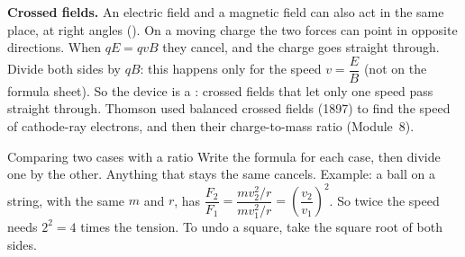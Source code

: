\textbf{Crossed fields.} An electric field and a magnetic field can also act in
the same place, at right angles (). On a moving charge the
two forces can point in opposite directions. When $qE = qvB$ they cancel, and
the charge goes straight through. Divide both sides by $qB$: this happens only
for the speed $v = \dfrac{E}{B}$ (not on the formula sheet). So the device is a
: crossed fields that let only one speed pass straight
through. Thomson used balanced crossed fields (1897) to find the speed of
cathode-ray electrons, and then their charge-to-mass ratio (Module~8).

\begin{toolkit}{Comparing two cases with a ratio}
Write the formula for each case, then divide one by the other. Anything that stays
the same cancels. Example: a ball on a string, with the same $m$ and $r$, has
$\dfrac{F_2}{F_1} = \dfrac{mv_2^2/r}{mv_1^2/r} = \left(\dfrac{v_2}{v_1}\right)^2$.
So twice the speed needs $2^2 = 4$ times the tension. To undo a square, take the
square root of both sides.
\end{toolkit}

